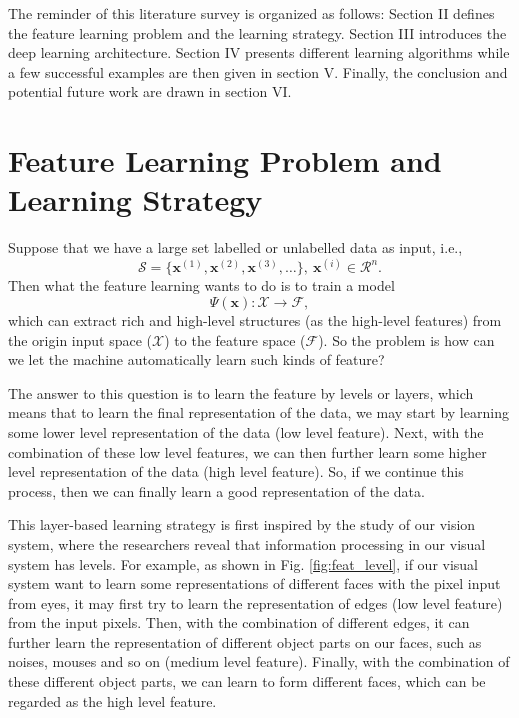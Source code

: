 \documentclass[conference]{IEEEtran}
\begin{document}
The reminder of this literature survey is organized as follows: Section II defines the feature learning problem and the learning strategy. Section III introduces the deep learning architecture. Section IV presents different learning algorithms while a few successful examples are then given in section V. Finally, the conclusion and potential future work are drawn in section VI.

\section{Feature Learning Problem and Learning Strategy}

Suppose that we have a large set labelled or unlabelled data as input, i.e., $$\mathcal{S}=\{\mathbf{x}^{(1)},\mathbf{x}^{(2)},\mathbf{x}^{(3)},\ldots\}, \ \mathbf{x}^{(i)}\in\mathcal{R}^n.$$
Then what the feature learning wants to do is to train a model
\begin{equation}
\Psi(\mathbf{x}):\mathcal{X} \rightarrow \mathcal{F},
\end{equation}
which can extract rich and high-level structures (as the high-level features) from the origin input space ($\mathcal{X}$) to the feature space ($\mathcal{F}$). So the problem is how can we let the machine automatically learn such kinds of feature?

The answer to this question is to learn the feature by levels or layers, which means that to learn the final representation of the data, we may start by learning some lower level representation of the data (low level feature). Next, with the combination of these low level features, we can then further learn some higher level representation of the data (high level feature). So, if we continue this process, then we can finally learn a good representation of the data.




This layer-based learning strategy is first inspired by the study of our vision system, where the researchers reveal that information processing in our visual system has levels. For example, as shown in Fig. \ref{fig:feat_level}, if our visual system want to learn some representations of different faces with the pixel input from eyes, it may first try to learn the representation of edges (low level feature) from the input pixels. Then, with the combination of different edges, it can further learn the representation of different object parts on our faces, such as noises, mouses and so on (medium level feature). Finally, with the combination of these different object parts, we can learn to form different faces, which can be regarded as the high level feature.
\end{document}
